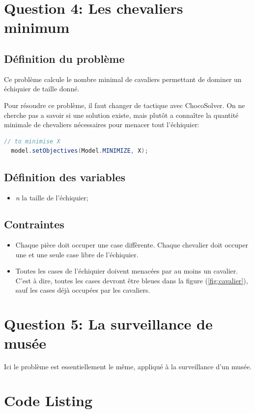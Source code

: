 \documentclass[letterpaper]{article}
\begin{document}
\section{Question 4: Les chevaliers minimum}

\subsection{Définition du problème}

Ce problème calcule le nombre minimal de cavaliers permettant de dominer
un échiquier de taille donné.

Pour résoudre ce problème, il faut changer de tactique avec
ChocoSolver. On ne cherche pas a savoir si une solution existe, mais
plutôt a connaître la quantité minimale de chevaliers nécessaires pour
menacer tout l'échiquier:

\begin{lstlisting}[language=java]
  // to minimise X
  model.setObjectives(Model.MINIMIZE, X);
\end{lstlisting}

\subsection{Définition des variables}

\begin{itemize}
\item \textit{n} la taille de l'échiquier;
\end{itemize}

\subsection{Contraintes}

\begin{itemize}
\item Chaque pièce doit occuper une case diffèrente. Chaque chevalier
  doit occuper une et une seule case libre de l'échiquier.
\item Toutes les cases de l'échiquier doivent menacées par au moins un
  cavalier. C'est à dire, toutes les cases devront être bleues dans la
  figure (\ref{fig:cavalier}), sauf les cases déjà occupées par les cavaliers.
\end{itemize}


\section{Question 5: La surveillance de musée}

Ici le problème est essentiellement le même, appliqué à la
surveillance d'un musée.

\newpage

\appendix

\section{Code Listing}


\end{document}
